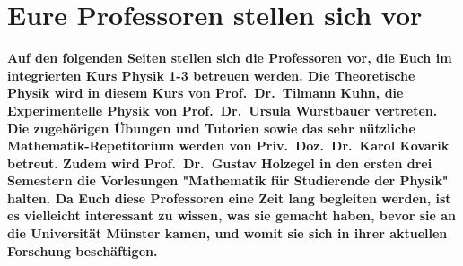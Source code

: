 \section[Eure Profs stellen sich vor]{Eure Professoren stellen sich vor}
\textbf{Auf den folgenden Seiten stellen sich die Professoren vor, die Euch im integrierten Kurs Physik 1-3 betreuen werden. 
Die Theoretische Physik wird in diesem Kurs von Prof.\ Dr.\ Tilmann Kuhn, die Experimentelle Physik von Prof.\ Dr.\ Ursula Wurstbauer vertreten. 
Die zugehörigen Übungen und Tutorien sowie das sehr nützliche Mathematik-Repetitorium werden von Priv.\ Doz.\ Dr.\ Karol Kovarik betreut. 
Zudem wird Prof.\ Dr.\ Gustav Holzegel in den ersten drei Semestern die Vorlesungen "Mathematik für Studierende der Physik" halten. Da Euch diese Professoren eine Zeit lang begleiten werden, ist es vielleicht interessant zu wissen, was sie gemacht haben, bevor sie an die Universität Münster kamen, und womit sie sich in ihrer aktuellen Forschung beschäftigen.}

